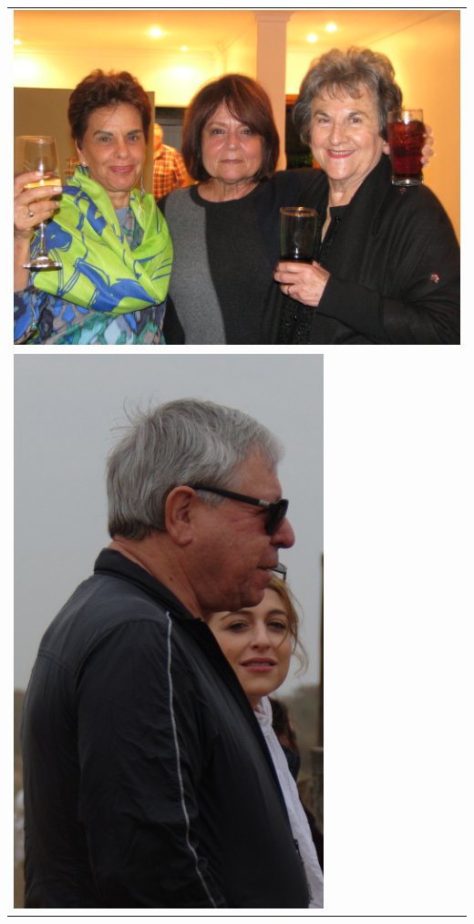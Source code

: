\documentclass[extrafontsizes,twoside,17pt,a4paper,openany]{memoir}
\begin{document}
\newpage
\begin{tabular}{l l}
\multicolumn{2}{l}{\includegraphics[width=155mm]{figs/zara.jpg}}\\
\includegraphics[width=9cm,trim=0mm 40mm 0mm 0mm,clip]{figs/charlie}
& 
\end{tabular}
\end{document}
